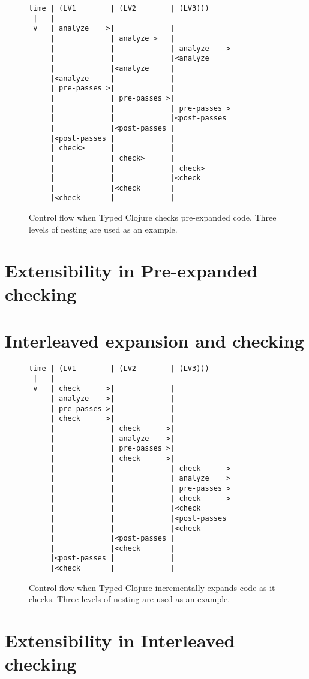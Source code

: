 \begin{figure*}
\begin{verbatim}
time | (LV1        | (LV2        | (LV3)))
 |   | ---------------------------------------
 v   | analyze    >|             |
     |             | analyze >   |
     |             |             | analyze    >
     |             |             |<analyze
     |             |<analyze     |
     |<analyze     |             |
     | pre-passes >|             |
     |             | pre-passes >|
     |             |             | pre-passes >
     |             |             |<post-passes
     |             |<post-passes |
     |<post-passes |             |
     | check>      |             |
     |             | check>      |
     |             |             | check>
     |             |             |<check
     |             |<check       |
     |<check       |             |
\end{verbatim}
  \caption{Control flow when Typed Clojure checks pre-expanded code.
  Three levels of nesting are used as an example.
  }
  \label{fig:analyzer:control-flow-pre-expand}
\end{figure*}

\chapter{Extensibility in Pre-expanded checking}


\chapter{Interleaved expansion and checking}

\begin{figure*}
\begin{verbatim}
time | (LV1        | (LV2        | (LV3)))
 |   | ---------------------------------------
 v   | check      >|             |
     | analyze    >|             |
     | pre-passes >|             |
     | check      >|             |
     |             | check      >|
     |             | analyze    >|
     |             | pre-passes >|
     |             | check      >|
     |             |             | check      >
     |             |             | analyze    >
     |             |             | pre-passes >
     |             |             | check      >
     |             |             |<check
     |             |             |<post-passes
     |             |             |<check
     |             |<post-passes |
     |             |<check       |
     |<post-passes |             |
     |<check       |             |
\end{verbatim}
  \caption{Control flow when Typed Clojure incrementally expands code as it checks.
  Three levels of nesting are used as an example.
  }
\end{figure*}

\chapter{Extensibility in Interleaved checking}
